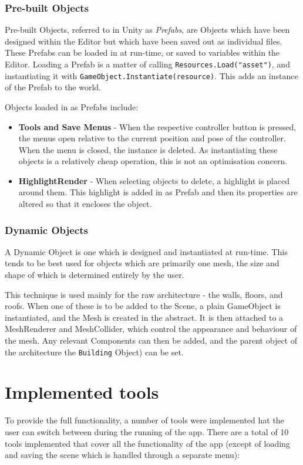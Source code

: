 \subsubsection*{Pre-built Objects}
Pre-built Objects, referred to in Unity as \textit{Prefabs}, are Objects which have been designed within the Editor but which have been saved out as individual files. These Prefabs can be loaded in at run-time, or saved to variables within the Editor. Loading a Prefab is a matter of calling \verb|Resources.Load("asset")|, and instantiating it with \verb|GameObject.Instantiate(resource)|. This adds an instance of the Prefab to the world.

Objects loaded in as Prefabs include:

\begin{itemize}
    \item \textbf{Tools and Save Menus} - When the respective controller button is pressed, the menus open relative to the current position and pose of the controller. When the menu is closed, the instance is deleted. As instantiating these objects is a relatively cheap operation, this is not an optimisation concern.
    \item \textbf{HighlightRender} - When selecting objects to delete, a highlight is placed around them. This highlight is added in as Prefab and then its properties are altered so that it encloses the object.
\end{itemize}

\subsubsection*{Dynamic Objects}

A Dynamic Object is one which is designed and instantiated at run-time. This tends to be best used for objects which are primarily one mesh, the size and shape of which is determined entirely by the user.

This technique is used mainly for the raw architecture - the walls, floors, and roofs. When one of these is to be added to the Scene, a plain GameObject is instantiated, and the Mesh is created in the abstract. It is then attached to a MeshRenderer and MeshCollider, which control the appearance and behaviour of the mesh. Any relevant Components can then be added, and the parent object of the architecture the \verb|Building| Object) can be set.

\section{Implemented tools}
\label{sec:tools}
To provide the full functionality, a number of tools were implemented hat the user can switch between during the running of the app. There are a total of 10 tools implemented that cover all the functionality of the app (except of loading and saving the scene which is handled through a separate menu):

